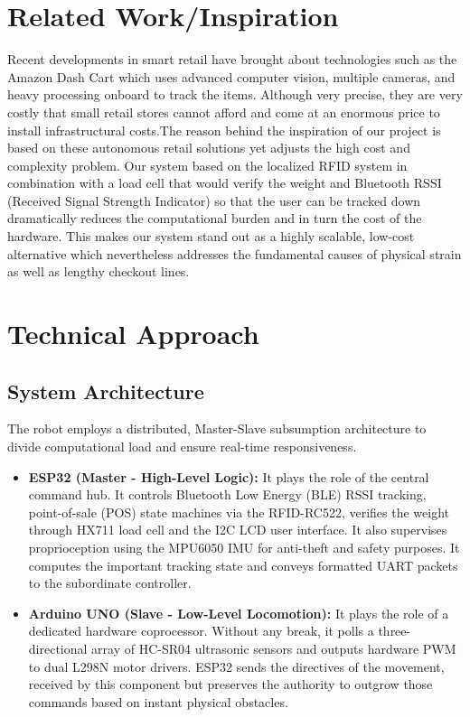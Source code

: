 \documentclass[12pt,a4paper]{article}
\begin{document}
\section{Related Work/Inspiration}
Recent developments in smart retail have brought about technologies such as the Amazon Dash Cart which uses advanced computer vision, multiple cameras, and heavy processing onboard to track the items. Although very precise, they are very costly that small retail stores cannot afford and come at an enormous price to install infrastructural costs.The reason behind the inspiration of our project is based on these autonomous retail solutions yet adjusts the high cost and complexity problem. Our system based on the localized RFID system in combination with a load cell that would verify the weight and Bluetooth RSSI (Received Signal Strength Indicator) so that the user can be tracked down dramatically reduces the computational burden and in turn the cost of the hardware. This makes our system stand out as a highly scalable, low-cost alternative which nevertheless addresses the fundamental causes of physical strain as well as lengthy checkout lines. 


\section{Technical Approach}
\subsection{System Architecture}
The robot employs a distributed, Master-Slave subsumption architecture to divide computational load and ensure real-time responsiveness.

\begin{itemize}
    \item \textbf{ESP32 (Master - High-Level Logic):} It plays the role of the central command hub. It controls Bluetooth Low Energy (BLE) RSSI tracking, point-of-sale (POS) state machines via the RFID-RC522, verifies the weight through HX711 load cell and the I2C LCD user interface. It also supervises proprioception using the MPU6050 IMU for anti-theft and safety purposes. It computes the important tracking state and conveys formatted UART packets to the subordinate controller.

    \item \textbf{Arduino UNO (Slave - Low-Level Locomotion):} It plays the role of a dedicated hardware coprocessor. Without any break, it  polls a three-directional array of HC-SR04 ultrasonic sensors and outputs hardware PWM to dual L298N motor drivers. ESP32 sends the directives of the movement, received by this component but preserves the authority to outgrow those commands based on instant physical obstacles.
\end{itemize}
\end{document}
